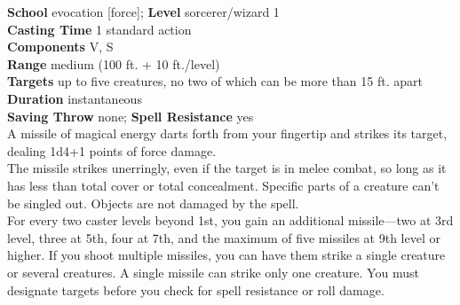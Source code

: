 \textbf{School} evocation [force]; \textbf{Level} sorcerer/wizard 1\\
\textbf{Casting Time} 1 standard action\\
\textbf{Components} V, S\\
\textbf{Range }medium (100 ft. + 10 ft./level)\\
\textbf{Targets} up to five creatures, no two of which can be more than 15 ft. apart\\
\textbf{Duration} instantaneous\\
\textbf{Saving Throw} none; \textbf{Spell Resistance} yes\\
A missile of magical energy darts forth from your fingertip and strikes its target, dealing 1d4+1 points of force damage.\\
The missile strikes unerringly, even if the target is in melee combat, so long as it has less than total cover or total concealment. Specific parts of a creature can't be singled out. Objects are not damaged by the spell.\\
For every two caster levels beyond 1st, you gain an additional missile---two at 3rd level, three at 5th, four at 7th, and the maximum of five missiles at 9th level or higher. If you shoot multiple missiles, you can have them strike a single creature or several creatures. A single missile can strike only one creature. You must designate targets before you check for spell resistance or roll damage.\\
